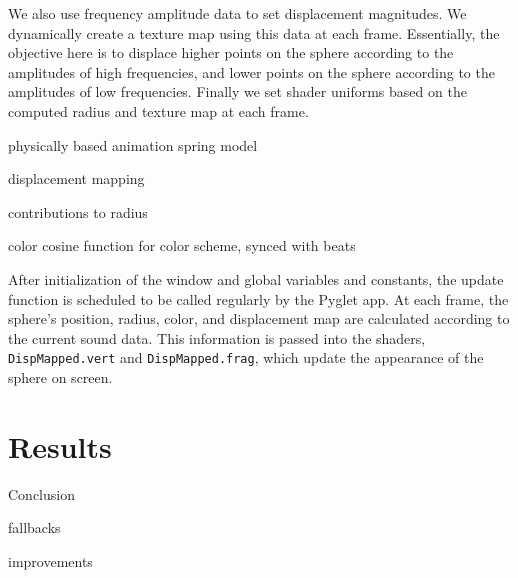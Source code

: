 \documentclass{article}
\newcommand{\code}{\texttt}
\begin{document}
We also use frequency amplitude data to set displacement magnitudes. We dynamically create a texture map using this data at each frame. Essentially, the objective here is to displace higher points on the sphere according to the amplitudes of high frequencies, and lower points on the sphere according to the amplitudes of low frequencies. Finally we set shader uniforms based on the computed radius and texture map at each frame.

physically based animation spring model

displacement mapping

contributions to radius

color cosine function for color scheme, synced with beats

After initialization of the window and global variables and constants, the update function is scheduled to be called regularly by the Pyglet app. At each frame, the sphere's position, radius, color, and displacement map are calculated according to the current sound data. This information is passed into the shaders, \code{DispMapped.vert} and \code{DispMapped.frag}, which update the appearance of the sphere on screen.

\section{Results}

Conclusion

fallbacks

improvements
\end{document}
